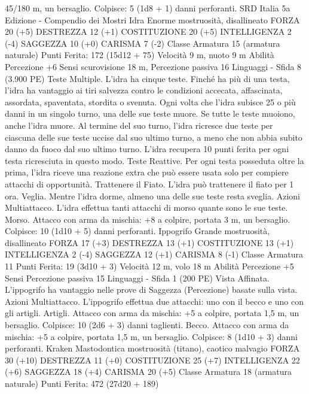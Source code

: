 \begin{multicols}{2}
45/180 m, un bersaglio.
Colpisce: 5 (1d8 + 1) danni perforanti.
SRD Italia 5a Edizione - Compendio dei Mostri
Idra
Enorme mostruosità, disallineato
FORZA 20 (+5)
DESTREZZA 12 (+1)
COSTITUZIONE 20 (+5)
INTELLIGENZA 2 (-4)
SAGGEZZA 10 (+0)
CARISMA 7 (-2)
Classe Armatura 15 (armatura naturale)
\hspace*{0pt}\hfill{Punti Ferita}: 172 (15d12 + 75)
Velocità 9 m, nuoto 9 m
Abilità Percezione +6
Sensi scurovisione 18 m, Percezione passiva 16
Linguaggi -
Sfida 8 (3.900 PE)
Teste Multiple. L’idra ha cinque teste. Finché ha più di una testa,
l’idra ha vantaggio ai tiri salvezza contro le condizioni accecata,
affascinata, assordata, spaventata, stordita o svenuta.
Ogni volta che l’idra subisce 25 o più danni in un singolo turno,
una delle sue teste muore. Se tutte le teste muoiono, anche l’idra
muore.
Al termine del suo turno, l’idra ricresce due teste per ciascuna
delle sue teste uccise dal suo ultimo turno, a meno che non abbia
subito danno da fuoco dal suo ultimo turno. L’idra recupera 10
punti ferita per ogni testa ricresciuta in questo modo.
Teste Reattive. Per ogni testa posseduta oltre la prima, l’idra
riceve una reazione extra che può essere usata solo per compiere
attacchi di opportunità.
Trattenere il Fiato. L’idra può trattenere il fiato per 1 ora.
Veglia. Mentre l’idra dorme, almeno una delle sue teste resta
sveglia.
Azioni
Multiattacco. L’idra effettua tanti attacchi di morso quante sono
le sue teste.
Morso. Attacco con arma da mischia: +8 a colpire, portata 3 m,
un bersaglio.
Colpisce: 10 (1d10 + 5) danni perforanti.
Ippogrifo
Grande mostruosità, disallineato
FORZA 17 (+3)
DESTREZZA 13 (+1)
COSTITUZIONE 13 (+1)
INTELLIGENZA 2 (-4)
SAGGEZZA 12 (+1)
CARISMA 8 (-1)
Classe Armatura 11
\hspace*{0pt}\hfill{Punti Ferita}: 19 (3d10 + 3)
Velocità 12 m, volo 18 m
Abilità Percezione +5
Sensi Percezione passiva 15
Linguaggi -
Sfida 1 (200 PE)
Vista Affinata. L’ippogrifo ha vantaggio nelle prove di Saggezza
(Percezione) basate sulla vista.
Azioni
Multiattacco. L’ippogrifo effettua due attacchi: uno con il becco
e uno con gli artigli.
Artigli. Attacco con arma da mischia: +5 a colpire, portata 1,5
m, un bersaglio.
Colpisce: 10 (2d6 + 3) danni taglienti.
Becco. Attacco con arma da mischia: +5 a colpire, portata 1,5 m,
un bersaglio.
Colpisce: 8 (1d10 + 3) danni perforanti.
Kraken
Mastodontica mostruosità (titano), caotico malvagio
FORZA 30 (+10)
DESTREZZA 11 (+0)
COSTITUZIONE 25 (+7)
INTELLIGENZA 22 (+6)
SAGGEZZA 18 (+4)
CARISMA 20 (+5)
Classe Armatura 18 (armatura naturale)
\hspace*{0pt}\hfill{Punti Ferita}: 472 (27d20 + 189)

\end{multicols}
